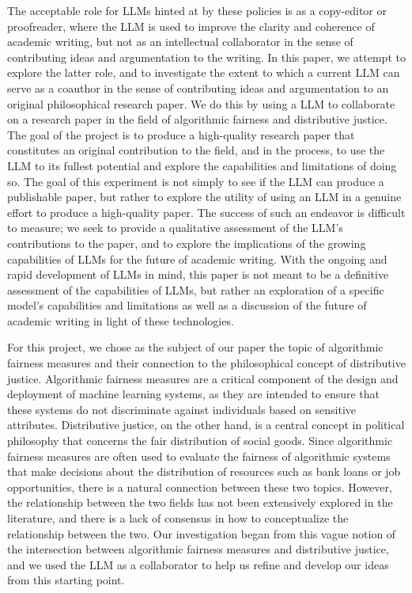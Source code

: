 The acceptable role for LLMs hinted at by these policies is as a copy-editor or
proofreader, where the LLM is used to improve the clarity and coherence of
academic writing, but not as an intellectual collaborator in the sense of 
contributing ideas and argumentation to the writing. In this paper, we attempt
to explore the latter role, and to investigate the extent to which a current LLM
can serve as a coauthor in the sense of contributing ideas and argumentation to
an original philosophical research paper. We do this by using a LLM to
collaborate on a research paper in the field of algorithmic fairness and
distributive justice. The goal of the project is to produce a high-quality 
research paper that constitutes an original contribution to the field, and in
the process, to use the LLM to its fullest potential and explore the
capabilities and limitations of doing so. The goal of this experiment is not
simply to see if the LLM can produce a publishable paper, but rather to explore
the utility of using an LLM in a genuine effort to produce a high-quality 
paper. The success of such an endeavor is difficult to measure;
we seek to provide a qualitative assessment of the LLM's contributions to the
paper, and to explore the implications of the growing capabilities of LLMs for
the future of academic writing. With the ongoing and rapid development of LLMs
in mind, this paper is not meant to be a definitive assessment of the
capabilities of LLMs, but rather an exploration of a specific model's
capabilities and limitations as well as a discussion of the future of academic
writing in light of these technologies.

For this project, we chose as the subject of our paper the topic of algorithmic
fairness measures and their connection to the philosophical concept of
distributive justice. Algorithmic fairness measures are a critical component of
the design and deployment of machine learning systems, as they are intended to
ensure that these systems do not discriminate against individuals based on
sensitive attributes. Distributive justice, on the other hand, is a central
concept in political philosophy that concerns the fair distribution of social
goods. Since algorithmic fairness measures are often used to evaluate the
fairness of algorithmic systems that make decisions about the distribution of
resources such as bank loans or job opportunities, there is a natural connection
between these two topics. However, the relationship between the two fields
has not been extensively explored in the literature, and there is a lack of
consensus in how to conceptualize the relationship between the two. Our
investigation began from this vague notion of the intersection between
algorithmic fairness measures and distributive justice, and we used the LLM as a
collaborator to help us refine and develop our ideas from this starting point.

